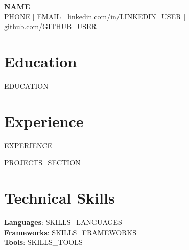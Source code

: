 \documentclass[letterpaper,11pt]{article}
\newcommand{\resumeSubHeadingListStart}{\begin{itemize}[leftmargin=0.15in, label={}]}
\newcommand{\resumeSubHeadingListEnd}{\end{itemize}}
\begin{document}
\begin{center}
    \textbf{\Huge \scshape {{NAME}}} \\ \vspace{1pt}
    \small {{PHONE}} $|$
    \href{mailto:{{EMAIL}}}{\underline{{{EMAIL}}}} $|$
    \href{{{LINKEDIN}}}{\underline{linkedin.com/in/{{LINKEDIN_USER}}}} $|$
    \href{{{GITHUB}}}{\underline{github.com/{{GITHUB_USER}}}}
\end{center}

\section{Education}
  \resumeSubHeadingListStart
    {{EDUCATION}}
  \resumeSubHeadingListEnd

\section{Experience}
  \resumeSubHeadingListStart
    {{EXPERIENCE}}
  \resumeSubHeadingListEnd

{{PROJECTS_SECTION}}

\section{Technical Skills}
 \begin{itemize}[leftmargin=0.15in, label={}]
    \small{\item{
     \textbf{Languages}{: {{SKILLS_LANGUAGES}}} \\
     \textbf{Frameworks}{: {{SKILLS_FRAMEWORKS}}} \\
     \textbf{Tools}{: {{SKILLS_TOOLS}}}
    }}
 \end{itemize}
\end{document}
